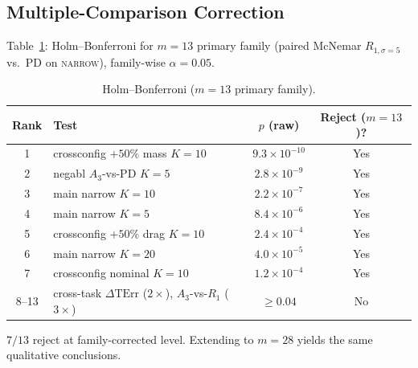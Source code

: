 \documentclass[11pt,a4paper]{article}
\newcommand{\TErr}{\mathrm{TErr}}
\begin{document}
\subsection{Multiple-Comparison Correction}
Table~\ref{tab:s5-holm}: Holm--Bonferroni for $m = 13$ primary family
(paired McNemar $R_{1,\sigma=5}$ vs.\ PD on \textsc{narrow}),
family-wise $\alpha = 0.05$.
\begin{table}[h]
\centering
\caption{Holm--Bonferroni ($m = 13$ primary family).}\label{tab:s5-holm}
\begin{tabular}{clcc}
\toprule
Rank & Test & $p$ (raw) & Reject ($m = 13$)? \\
\midrule
1 & crossconfig $+50\%$ mass $K{=}10$ & $9.3 \times 10^{-10}$ & Yes \\
2 & negabl $A_3$-vs-PD $K{=}5$      & $2.8 \times 10^{-9}$  & Yes \\
3 & main narrow $K{=}10$             & $2.2 \times 10^{-7}$  & Yes \\
4 & main narrow $K{=}5$              & $8.4 \times 10^{-6}$  & Yes \\
5 & crossconfig $+50\%$ drag $K{=}10$ & $2.4 \times 10^{-4}$  & Yes \\
6 & main narrow $K{=}20$             & $4.0 \times 10^{-5}$  & Yes \\
7 & crossconfig nominal $K{=}10$     & $1.2 \times 10^{-4}$  & Yes \\
8--13 & cross-task $\Delta\TErr$ ($2\times$), $A_3$-vs-$R_1$ ($3\times$) & $\ge 0.04$ & No \\
\bottomrule
\end{tabular}
\par\smallskip
$7/13$ reject at family-corrected level. Extending to $m = 28$ yields
the same qualitative conclusions.
\end{table}
\end{document}
